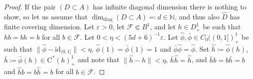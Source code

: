 \documentclass[11pt,a4paper]{amsart}
\theoremstyle{definition}
\numberwithin{equation}{section}
\newcommand{\mc}[1]{\mathcal{#1}}
\begin{document}
\begin{proof}
If the pair $(D\subset A)$ has infinite diagonal dimension there is nothing to show, so let us assume that $\dim_\mathrm{diag}(D\subset A)\eqqcolon d\in\mathbb{N}$, and thus also $\widehat{D}$ has finite covering dimension. Let $\varepsilon>0$, let $\mc{F}\Subset B^1$, and let $h\in D_+^1$ be such that $hb=bh=b$ for all $b\in\mc{F}$.  Let $0<\eta< (5d+6)^{-1}\varepsilon$. Let $\hat{\phi},\bar{\phi}\in C_0((0,1])_+^1$ be such that $\|\hat{\phi}-\mathrm{id}_{(0,1]}\|<\eta$, $\hat{\phi}(1)=\bar{\phi}(1)=1$ and $\bar{\phi}\hat{\phi}=\hat{\phi}$. Set $\hat{h}\coloneqq \hat{\phi}(h)$, $\bar{h}\coloneqq\bar{\phi}(h)\in \mathrm{C}^\ast(h)_+^1$ and note that $\|\hat{h}-h\|<\eta$, $\bar{h}\hat{h} = \hat{h}$, and $\bar{h}b=b\bar{h}=b$ and $\hat{h}b=b\hat{h}=b$ for all $b\in\mc{F}$.



\end{proof}
\end{document}
